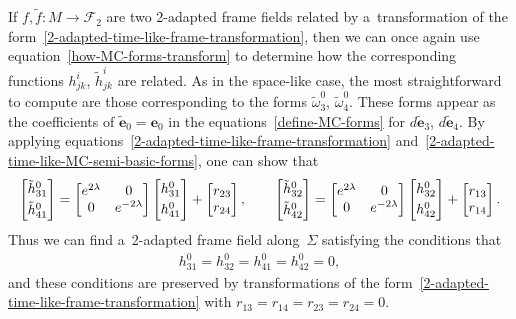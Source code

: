 \documentclass[10pt,a4paper]{amsart}
\numberwithin{equation}{section}
\theoremstyle{definition}
\begin{document}
If $f, \tilde{f}:M \to \mathcal{F}_2$ are two 2-adapted frame f\/ields related by a~transformation of the
form~\eqref{2-adapted-time-like-frame-transformation}, then we can once again use equation~\eqref{how-MC-forms-transform}
to determine how the corresponding functions $h^i_{jk}$, $\tilde{h}^i_{jk}$ are related.
As in the space-like case, the most straightforward to compute are those correspon\-ding to the forms $\tilde{\omega}^0_3$, $\tilde{\omega}^0_4$.
These forms appear as the coef\/f\/icients of $\tilde{\mathbf{e}}_0 = \mathbf{e}_0$ in the equations~\eqref{define-MC-forms}
for $d\tilde{\mathbf{e}}_3$, $d\tilde{\mathbf{e}}_4$.
By applying equations~\eqref{2-adapted-time-like-frame-transformation}
and~\eqref{2-adapted-time-like-MC-semi-basic-forms}, one can show that
\begin{gather*}
\begin{bmatrix}
\tilde{h}^0_{31}
\vspace{1mm}\\
\tilde{h}^0_{41}
\end{bmatrix}
=
\begin{bmatrix}
e^{2\lambda} & 0
\\
0 & e^{-2\lambda}
\end{bmatrix}
\begin{bmatrix}
h^0_{31}
\vspace{1mm}\\
h^0_{41}
\end{bmatrix}
+
\begin{bmatrix}
r_{23}
\\
r_{24}
\end{bmatrix},
\qquad
\begin{bmatrix}
\tilde{h}^0_{32}
\vspace{1mm}\\
\tilde{h}^0_{42}
\end{bmatrix}
=
\begin{bmatrix}
e^{2\lambda} & 0
\\
0 & e^{-2\lambda}
\end{bmatrix}
\begin{bmatrix}
h^0_{32}
\vspace{1mm}\\
h^0_{42}
\end{bmatrix}
+
\begin{bmatrix}
r_{13}
\\
r_{14}
\end{bmatrix}.
\end{gather*}
Thus we can f\/ind a~2-adapted frame f\/ield along~$\Sigma$ satisfying the conditions that
\begin{gather*}
h^0_{31} = h^0_{32} = h^0_{41} = h^0_{42} = 0,
\end{gather*}
and these conditions are preserved by transformations of the form~\eqref{2-adapted-time-like-frame-transformation} with
$r_{13} = r_{14} = r_{23} = r_{24} = 0$.
\end{document}
